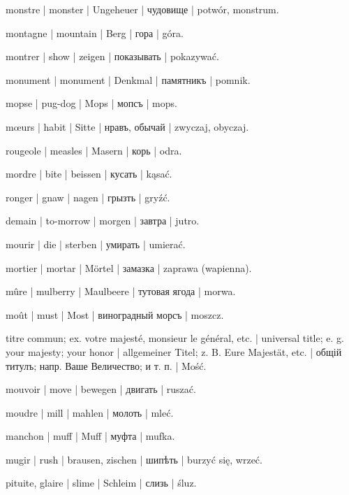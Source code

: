 \begin{outdent}{1em}
monstre | monster | Ungeheuer | чудовище | potwór, monstrum.

montagne | mountain | Berg | гора | góra.

montrer | show | zeigen | показывать | pokazywać.

monument | monument | Denkmal | памятникъ | pomnik.

mopse | pug-dog | Mops | мопсъ | mops.

mœurs | habit | Sitte | нравъ, обычай | zwyczaj,
obyczaj.

rougeole | measles | Masern | корь | odra.

mordre | bite | beissen | кусать | kąsać.

\uvsubentry{}
ronger | gnaw | nagen | грызть | gryźć.

demain | to-morrow | morgen | завтра | jutro.

mourir | die | sterben | умирать | umierać.

mortier | mortar | Mörtel | замазка | zaprawa (wapienna).

mûre | mulberry | Maulbeere | тутовая ягода | morwa.

moût | must | Most | виноградный морсъ | moszcz.

titre commun; ex.  votre majesté,  monsieur le général,  etc. | universal title; e. g.  your majesty; 
your honor | allgemeiner Titel; z. B.  Eure
Majestät,  etc. | общій титулъ; напр.  Ваше Величество;  и т. п. | Mość.

mouvoir | move | bewegen | двигать | ruszać.

moudre | mill | mahlen | молоть | mleć.

manchon | muff | Muff | муфта | mufka.

mugir | rush | brausen, zischen | шипѣть | burzyć się, wrzeć.

pituite, glaire | slime | Schleim | слизь | śluz.


\end{outdent}
